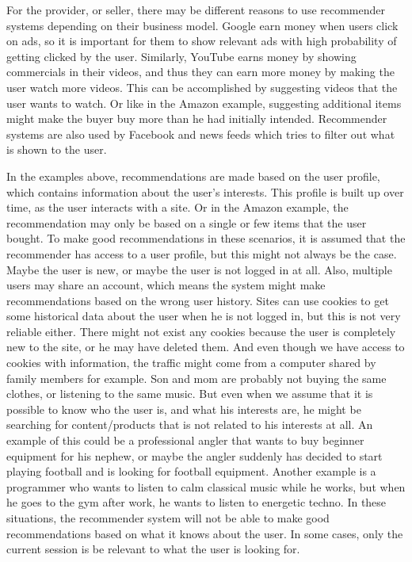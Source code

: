 For the provider, or seller, there may be different reasons to use recommender systems depending on their business model. Google earn money when users click on ads, so it is important for them to show relevant ads with high probability of getting clicked by the user. Similarly, YouTube earns money by showing commercials in their videos, and thus they can earn more money by making the user watch more videos. This can be accomplished by suggesting videos that the user wants to watch. Or like in the Amazon example, suggesting additional items might make the buyer buy more than he had initially intended. Recommender systems are also used by Facebook and news feeds which tries to filter out what is shown to the user.


In the examples above, recommendations are made based on the user profile, which contains information about the user's interests. This profile is built up over time, as the user interacts with a site. Or in the Amazon example, the recommendation may only be based on a single or few items that the user bought. To make good recommendations in these scenarios, it is assumed that the recommender has access to a user profile, but this might not always be the case. Maybe the user is new, or maybe the user is not logged in at all. Also, multiple users may share an account, which means the system might make recommendations based on the wrong user history. Sites can use cookies to get some historical data about the user when he is not logged in, but this is not very reliable either. There might not exist any cookies because the user is completely new to the site, or he may have deleted them. And even though we have access to cookies with information, the traffic might come from a computer shared by family members for example. Son and mom are probably not buying the same clothes, or listening to the same music. But even when we assume that it is possible to know who the user is, and what his interests are, he might be searching for content/products that is not related to his interests at all. An example of this could be a professional angler that wants to buy beginner equipment for his nephew, or maybe the angler suddenly has decided to start playing football and is looking for football equipment. Another example is a programmer who wants to listen to calm classical music while he works, but when he goes to the gym after work, he wants to listen to energetic techno. In these situations, the recommender system will not be able to make good recommendations based on what it knows about the user. In some cases, only the current session is be relevant to what the user is looking for.

